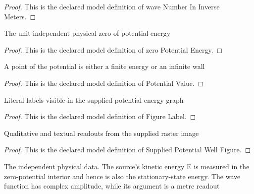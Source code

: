 \begin{proof}
  This is the declared model definition of wave Number In Inverse Meters.
\end{proof}
\begin{definition}
  \label{def:physics:phyx-mini-0617:phyxminiproblems-problemphyxmini0617-zeropotentialenergy}
  The unit-independent physical zero of potential energy
\end{definition}
\begin{proof}
  This is the declared model definition of zero Potential Energy.
\end{proof}
\begin{definition}
  \label{def:physics:phyx-mini-0617:phyxminiproblems-problemphyxmini0617-potentialvalue}
  A point of the potential is either a finite energy or an infinite wall
\end{definition}
\begin{proof}
  This is the declared model definition of Potential Value.
\end{proof}
\begin{definition}
  \label{def:physics:phyx-mini-0617:phyxminiproblems-problemphyxmini0617-figurelabel}
  Literal labels visible in the supplied potential-energy graph
\end{definition}
\begin{proof}
  This is the declared model definition of Figure Label.
\end{proof}
\begin{definition}
  \label{def:physics:phyx-mini-0617:phyxminiproblems-problemphyxmini0617-suppliedpotentialwellfigure}
  Qualitative and textual readouts from the supplied raster image
\end{definition}
\begin{proof}
  This is the declared model definition of Supplied Potential Well Figure.
\end{proof}
\begin{definition}
  \label{def:physics:phyx-mini-0617:phyxminiproblems-problemphyxmini0617-finitepotentialwellsetup}
  The independent physical data. The source's kinetic energy E is measured in the zero-potential interior and hence is also the stationary-state energy. The wave function has complex amplitude, while its argument is a metre readout
\end{definition}

